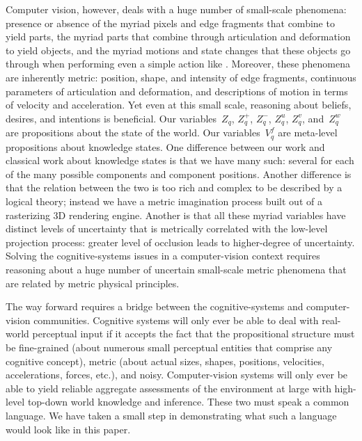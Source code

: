 Computer vision, however, deals with a huge number of small-scale phenomena:
presence or absence of the myriad pixels and edge fragments that combine to
yield parts, the myriad parts that combine through articulation and deformation
to yield objects, and the myriad motions and state changes that these objects
go through when performing even a simple action like .
%
Moreover, these phenomena are inherently metric: position, shape, and intensity
of edge fragments, continuous parameters of articulation and deformation, and
descriptions of motion in terms of velocity and acceleration.
%
Yet even at this small scale, reasoning about beliefs, desires, and intentions
is beneficial.
%
Our variables~$Z_q$, $Z^+_q$, $Z^-_q$, $Z^u_q$, $Z^v_q$, and~$Z^w_q$ are
propositions about the state of the world.
%
Our variables~$V^f_q$ are meta-level propositions about knowledge states.
%
One difference between our work and classical work about knowledge states is
that we have many such: several for each of the many possible components and
component positions.
%
Another difference is that the relation between the two is too rich and complex
to be described by a logical theory; instead we have a metric imagination
process built out of a rasterizing 3D rendering engine.
%
Another is that all these myriad variables have distinct levels of uncertainty
that is metrically correlated with the low-level projection process: greater level
of occlusion leads to higher-degree of uncertainty.
%
Solving the cognitive-systems issues in a computer-vision context requires
reasoning about a huge number of uncertain small-scale metric phenomena that are
related by metric physical principles.

The way forward requires a bridge between the cognitive-systems and
computer-vision communities.
%
Cognitive systems will only ever be able to deal with real-world perceptual
input if it accepts the fact that the propositional structure must be
fine-grained (about numerous small perceptual entities that comprise any
cognitive concept), metric (about actual sizes, shapes, positions, velocities,
accelerations, forces, etc.), and noisy.
%
Computer-vision systems will only ever be able to yield reliable aggregate
assessments of the environment at large with high-level top-down world
knowledge and inference.
%
These two must speak a common language.
%
We have taken a small step in demonstrating what such a language would look
like in this paper.
